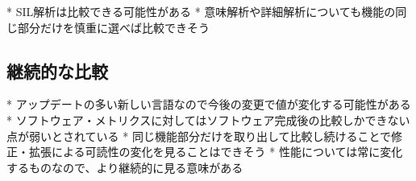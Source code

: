 * SIL解析は比較できる可能性がある
* 意味解析や詳細解析についても機能の同じ部分だけを慎重に選べば比較できそう

\subsection{継続的な比較}

* アップデートの多い新しい言語なので今後の変更で値が変化する可能性がある
* ソフトウェア・メトリクスに対してはソフトウェア完成後の比較しかできない点が弱いとされている
* 同じ機能部分だけを取り出して比較し続けることで修正・拡張による可読性の変化を見ることはできそう
* 性能については常に変化するものなので、より継続的に見る意味がある

